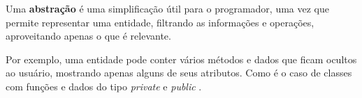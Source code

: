 Uma \textbf{abstração} é uma simplificação útil para o programador, uma vez que
permite representar uma entidade, filtrando as informações e operações,
aproveitando apenas o que é relevante.

Por exemplo, uma entidade pode conter vários métodos e dados que ficam ocultos
ao usuário, mostrando apenas alguns de seus atributos. Como é o caso de classes
com funções e dados do tipo \emph{private} e \emph{public} .

